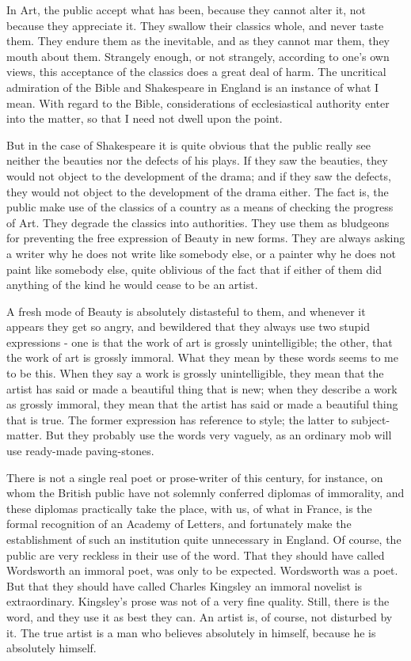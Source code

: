 In Art, the public accept what has been, because they cannot alter it, not because they appreciate it. They swallow their classics whole, and never taste them. They endure them as the inevitable, and as they cannot mar them, they mouth about them. Strangely enough, or not strangely, according to one’s own views, this acceptance of the classics does a great deal of harm. The uncritical admiration of the Bible and Shakespeare in England is an instance of what I mean. With regard to the Bible, considerations of ecclesiastical authority enter into the matter, so that I need not dwell upon the point.\par

But in the case of Shakespeare it is quite obvious that the public really see neither the beauties nor the defects of his plays. If they saw the beauties, they would not object to the development of the drama; and if they saw the defects, they would not object to the development of the drama either. The fact is, the public make use of the classics of a country as a means of checking the progress of Art. They degrade the classics into authorities. They use them as bludgeons for preventing the free expression of Beauty in new forms. They are always asking a writer why he does not write like somebody else, or a painter why he does not paint like somebody else, quite oblivious of the fact that if either of them did anything of the kind he would cease to be an artist.\par

A fresh mode of Beauty is absolutely distasteful to them, and whenever it appears they get so angry, and bewildered that they always use two stupid expressions - one is that the work of art is grossly unintelligible; the other, that the work of art is grossly immoral. What they mean by these words seems to me to be this. When they say a work is grossly unintelligible, they mean that the artist has said or made a beautiful thing that is new; when they describe a work as grossly immoral, they mean that the artist has said or made a beautiful thing that is true. The former expression has reference to style; the latter to subject-matter. But they probably use the words very vaguely, as an ordinary mob will use ready-made paving-stones.\par

There is not a single real poet or prose-writer of this century, for instance, on whom the British public have not solemnly conferred diplomas of immorality, and these diplomas practically take the place, with us, of what in France, is the formal recognition of an Academy of Letters, and fortunately make the establishment of such an institution quite unnecessary in England. Of course, the public are very reckless in their use of the word. That they should have called Wordsworth an immoral poet, was only to be expected. Wordsworth was a poet. But that they should have called Charles Kingsley an immoral novelist is extraordinary. Kingsley’s prose was not of a very fine quality. Still, there is the word, and they use it as best they can. An artist is, of course, not disturbed by it. The true artist is a man who believes absolutely in himself, because he is absolutely himself.\par

